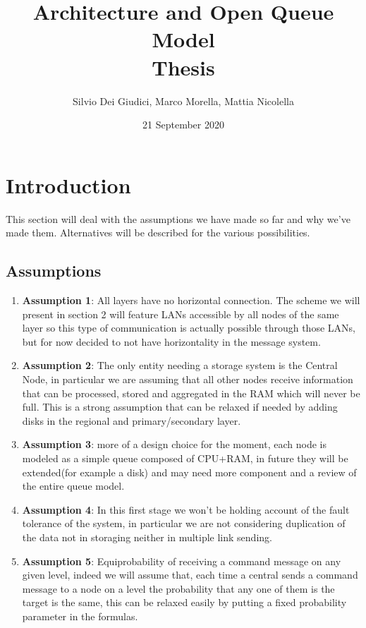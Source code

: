 \documentclass[11pt]{article}
\title {Architecture and Open Queue Model \\ \bigskip \large Thesis}
\author {Silvio Dei Giudici, Marco Morella, Mattia Nicolella}
\date{21 September 2020}
\begin{document}
\maketitle
\section{Introduction}
This section will deal with the assumptions we have made so far and why we've made them. Alternatives will be described for the various possibilities.\\
\subsection{Assumptions}
\begin{enumerate}
\item \textbf{Assumption 1}: All layers have no horizontal connection. The scheme we will present in section 2 will feature LANs accessible by all nodes of the same layer so this type of communication is actually possible through those LANs, but for now decided to not have horizontality in the message system.
\item \textbf{Assumption 2}: The only entity needing a storage system is the Central Node, in particular we are assuming that all other nodes receive information that can be processed, stored and aggregated in the RAM which will never be full. This is a strong assumption that can be relaxed if needed by adding disks in the regional and primary/secondary layer.
\item \textbf{Assumption 3}: more of a design choice for the moment, each node is modeled as a simple queue composed of CPU+RAM, in future they will be extended(for example a disk) and may need more component and a review of the entire queue model.
\item \textbf{Assumption 4}: In this first stage we won't be holding account of the fault tolerance of the system, in particular we are not considering duplication of the data not in storaging neither in multiple link sending.
\item \textbf{Assumption 5}: Equiprobability of receiving a command message on any given level, indeed we will assume that, each time a central sends a command message to a node on a level the probability that any one of them is the target is the same, this can be relaxed easily by putting a fixed probability parameter in the formulas.

\end{enumerate}
\end{document}
